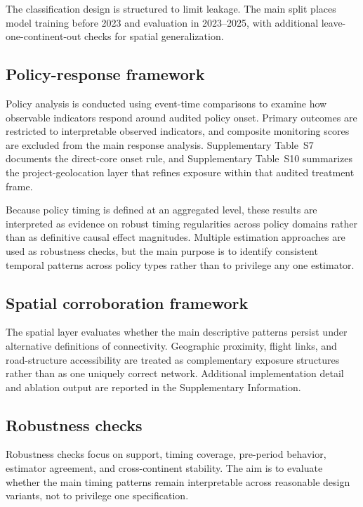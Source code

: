 \documentclass[oneside,pdflatex,sn-nature]{sn-jnl}
\begin{document}
The classification design is structured to limit leakage. The main split places model training before 2023 and evaluation in 2023--2025, with additional leave-one-continent-out checks for spatial generalization.

\subsection{Policy-response framework}
Policy analysis is conducted using event-time comparisons to examine how observable indicators respond around audited policy onset. Primary outcomes are restricted to interpretable observed indicators, and composite monitoring scores are excluded from the main response analysis. Supplementary Table~S7 documents the direct-core onset rule, and Supplementary Table~S10 summarizes the project-geolocation layer that refines exposure within that audited treatment frame.

Because policy timing is defined at an aggregated level, these results are interpreted as evidence on robust timing regularities across policy domains rather than as definitive causal effect magnitudes. Multiple estimation approaches are used as robustness checks, but the main purpose is to identify consistent temporal patterns across policy types rather than to privilege any one estimator.\cite{sun2021event,santanna2020dr,athey2021matrix,abadie2010synthetic}

\subsection{Spatial corroboration framework}
The spatial layer evaluates whether the main descriptive patterns persist under alternative definitions of connectivity. Geographic proximity, flight links, and road-structure accessibility are treated as complementary exposure structures rather than as one uniquely correct network. Additional implementation detail and ablation output are reported in the Supplementary Information.

\subsection{Robustness checks}
Robustness checks focus on support, timing coverage, pre-period behavior, estimator agreement, and cross-continent stability. The aim is to evaluate whether the main timing patterns remain interpretable across reasonable design variants, not to privilege one specification.
\end{document}
